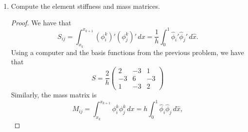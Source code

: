 \documentclass{article}
\begin{document}
\begin{enumerate}
\begin{proof}
\begin{align*}
			      \widehat \phi_2(0) & = 0 & \widehat \phi_2(1) & = 0 & \int_0^1\widehat \phi_2(\widehat x)\,d\widehat x & = 1 \\
			      \widehat \phi_3(0) & = 1 & \widehat \phi_3(1) & = 1 & \int_0^1\widehat \phi_3(\widehat x)\,d\widehat x & = 0
		      \end{align*}
		      Since these are all quadratic polynomials, we have that
		      \begin{align*}
			      \widehat\phi_1(\widehat x) & = (1-\widehat x)\widehat\psi_1(\widehat x), \\
			      \widehat\phi_2(\widehat x) & = \widehat x(1-\widehat x)\widehat\chi_2,   \\
			      \widehat\phi_3(\widehat x) & = \widehat x\widehat\psi_3(\widehat x)
		      \end{align*}
		      for some degree one polynomials $\widehat \psi_1$, $\widehat \psi_3$ and a constant $\widehat \chi_2$.
		      Writing the degree one polynomials out in the monomial basis and then using the integral dofs tells us that
		      \begin{align*}
			      \widehat\phi_1(\widehat x) & = (1-\widehat x)(1-3\widehat x), \\
			      \widehat\phi_2(\widehat x) & = 6\widehat x(1-\widehat x),     \\
			      \widehat\phi_3(\widehat x) & = \widehat x(3\widehat x - 2)
		      \end{align*}
		      Now we map the reference interval onto a physical interval via \[\widehat x \mapsto x_j + h\widehat x.\]
		      Using these, we have that the basis functions are
		      \[\phi_i^j(x) = \widehat\phi_i\left(\frac{x-x_j}{h}\right).\]
	      \end{proof}
	\item Compute the element stiffness and mass matrices.
	      \begin{proof}
		      We have that \[S_{ij} = \int_{x_k}^{x_{k+1}} (\phi_i^k)'(\phi_j^k)'\,dx = \frac{1}{h}\int_0^1\widehat\phi_i'\widehat\phi_j'\,d\widehat x.\]
		      Using a computer and the basis functions from the previous problem, we have that
		      \[S = \frac{2}{h}\begin{pmatrix} 2 & -3 & 1 \\ -3 & 6 & -3 \\ 1 & -3 & 2 \end{pmatrix}\]
		      Similarly, the mass matrix is
		      \[M_{ij} = \int_{x_k}^{x_{k+1}} \phi_i^k\phi_j^k\,dx = h\int_0^1\widehat\phi_i\widehat\phi_j\,d\widehat x,\]

\end{proof}
\end{enumerate}
\end{document}
